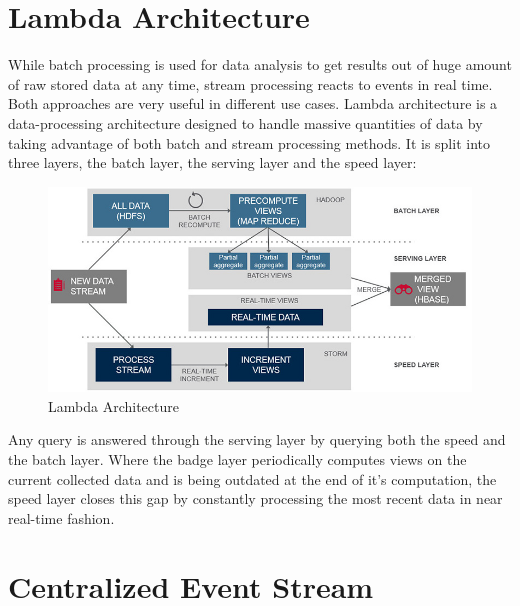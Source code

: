 \section{Lambda Architecture}
While batch processing is used for data analysis to get results out of huge
amount of raw stored data at any time, stream processing reacts to events in
real time. Both approaches are very useful in different use cases. Lambda
architecture is a data-processing architecture designed to handle massive
quantities of data by taking advantage of both batch and stream processing
methods. It is split into three layers, the batch layer, the serving layer and
the speed layer:

\begin{figure}[H]
    \centering
    \includegraphics[width=1.0\textwidth]{images/lambda-architecture.jpg}
    \caption{Lambda Architecture}
    \label{fig:lambda-Architecture}
\end{figure}

Any query is answered through the serving layer by querying both the speed and
the batch layer. Where the badge layer periodically computes views on the
current collected data and is being outdated at the end of it's computation, the
speed layer closes this gap by constantly processing the most recent data in
near real-time fashion. \cite{marz2015big} \cite{PrpSvyOfDSPS}

\section{Centralized Event Stream}
